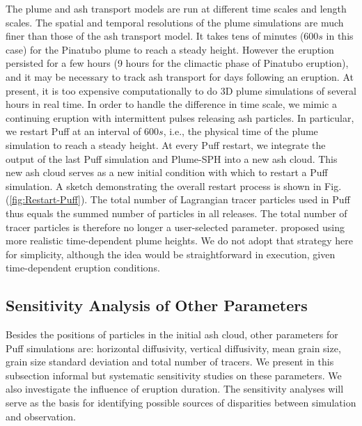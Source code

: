 \documentclass[utf8]{frontiersSCNS} %
\begin{document}
The plume and ash transport models are run at different time scales and length scales. The spatial and temporal resolutions of the plume simulations are much finer than those of the ash transport model. It takes tens of minutes ($600 s$ in this case) for the Pinatubo plume to reach a steady height. However the eruption persisted for a few hours (9 hours for the climactic phase of Pinatubo eruption), and it may be necessary to track ash transport for days following an eruption. At present, it is too expensive computationally to do 3D plume simulations of several hours in real time. In order to handle the difference in time scale, we mimic a continuing eruption with intermittent pulses releasing ash particles. In particular, we restart Puff at an interval of $600 s$, i.e., the physical time of the plume simulation to reach a steady height. At every Puff restart, we integrate the output of the last Puff simulation and Plume-SPH into a new ash cloud. This new ash cloud serves as a new initial condition with which to restart a Puff simulation. A sketch demonstrating the overall restart process is shown in Fig. (\ref{fig:Restart-Puff}). The total number of Lagrangian tracer particles used in Puff thus equals the summed number of particles in all releases. The total number of tracer particles is therefore no longer a user-selected parameter.  \citet{fero2008simulation} proposed using more realistic time-dependent plume heights. We do not adopt that strategy here for simplicity, although the idea would be straightforward in execution, given time-dependent eruption conditions.

\subsection{Sensitivity Analysis of Other Parameters}

Besides the positions of particles in the initial ash cloud, other parameters for Puff simulations are: horizontal diffusivity, vertical diffusivity, mean grain size, grain size standard deviation and total number of tracers. We present in this subsection informal but systematic sensitivity studies on these parameters. We also investigate the influence of eruption duration. The sensitivity analyses will serve as the basis for identifying possible sources of disparities between simulation and observation.
\end{document}
